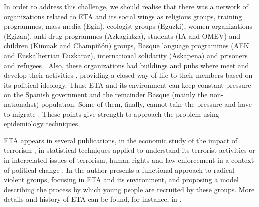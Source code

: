 In order to address this challenge, we should realise that there was a network of organizations related to ETA and its social wings as religious groups, training programmes, mass media (Egin), ecologist groups (Eguzki), women organizations (Egizan), anti-drug programmes (Azkagintza), students (IA and OMEV) and children (Kimuak and Champi\~n\'on) groups, Basque language programmes (AEK and Euskalherrian Euzkaraz), international solidarity (Askapena) and prisoners and refugees \cite{llera}. Also, these organizations had buildings and pubs where meet and develop their activities \cite{miguel, sentencia}, providing a closed way of life to their members based on its political ideology. Thus, ETA and its environment can keep constant pressure on the Spanish government and the remainder Basque (mainly the non-nationalist) population. Some of them, finally, cannot take the pressure and have to migrate \cite{exilio2, exilio3, exilio1}. These points give strength to approach the problem using epidemiology techniques. 

ETA appears in several publications, in the economic study of the impact of terrorism \cite{Abadie, Lbuesa, Enders1, Enders2}, in statistical techniques applied to understand its terrorist activities \cite{Barros2, Barros3, BARROS} or in interrelated issues of terrorism, human rights and law enforcement in a context of political change  \cite{Alonso}. In \cite{miguel} the author presents a functional approach to radical violent groups, focusing in ETA and its environment, and proposing a model describing the process by which young people are recruited by these groups. More details and history of ETA can be found, for instance, in \cite{Barros3, BARROS, Ldominguez, Lreinares}.
